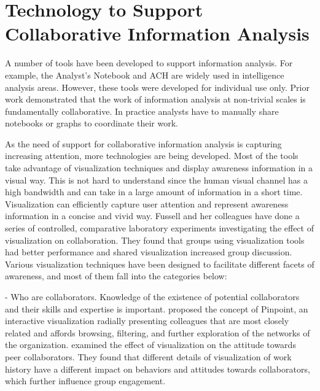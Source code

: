 \section{Technology to Support Collaborative Information Analysis}

A number of tools have been developed to support information analysis. For example, the Analyst’s Notebook \citep{IBM} and ACH \citep{PARC} are widely used in intelligence analysis areas. However, these tools were developed for individual use only. Prior work demonstrated that the work of information analysis at non-trivial scales is fundamentally collaborative. In practice analysts have to manually share notebooks or graphs to coordinate their work.

As the need of support for collaborative information analysis is capturing increasing attention, more technologies are being developed. Most of the tools take advantage of visualization techniques and display awareness information in a visual way. This is not hard to understand since the human visual channel has a high bandwidth and can take in a large amount of information in a short time. Visualization can efficiently capture user attention and represent awareness information in a concise and vivid way. Fussell and her colleagues \citep{Balakrishnan2010e,Goyal2013,Goyal2016} have done a series of controlled, comparative laboratory experiments investigating the effect of visualization on collaboration. They found that groups using visualization tools had better performance and shared visualization increased group discussion. Various visualization techniques have been designed to facilitate different facets of awareness, and most of them fall into the categories below: 

- Who are collaborators. Knowledge of the existence of potential collaborators and their skills and expertise is important. \cite{Forsen2009a} proposed the concept of Pinpoint, an interactive visualization radially presenting colleagues that are most closely related and affords browsing, filtering, and further exploration of the networks of the organization. \cite{Marlow2015a} examined the effect of visualization on the attitude towards peer collaborators. They found that different details of visualization of work history have a different impact on behaviors and attitudes towards collaborators, which further influence group engagement.
  
